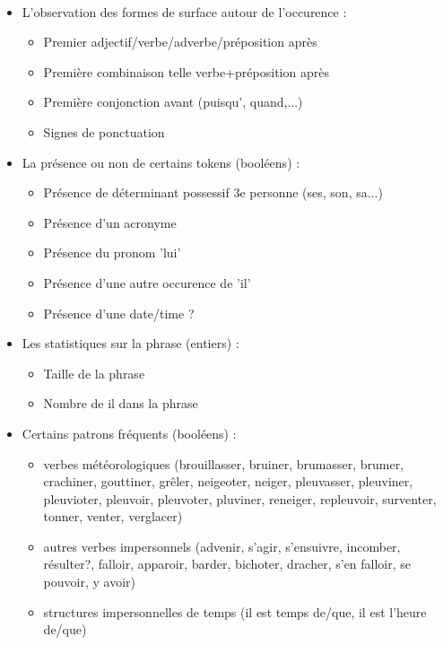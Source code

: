 \documentclass[a4paper,12pt]{article}
\begin{document}
\paragraph{}
\begin{itemize}
 \item[\textbullet] L'observation des formes de surface autour de l'occurence :
 \begin{itemize}
  \item Premier adjectif/verbe/adverbe/préposition après
  \item Première combinaison telle verbe+préposition après
  \item Première conjonction avant (puisqu', quand,...)
  \item Signes de ponctuation
 \end{itemize}
 \item[\textbullet] La présence ou non de certains tokens (booléens) :
 \begin{itemize}
  \item Présence de déterminant possessif 3e personne (ses, son, sa...)
  \item Présence d'un acronyme
  \item Présence du pronom 'lui'
  \item Présence d'une autre occurence de 'il'
  \item Présence d'une date/time ?
 \end{itemize}
 \item[\textbullet] Les statistiques sur la phrase (entiers) :
 \begin{itemize}
  \item Taille de la phrase
  \item Nombre de \og{}il\fg{} dans la phrase
 \end{itemize}
 \item[\textbullet] Certains patrons fréquents (booléens) :
 \begin{itemize}
  \item verbes météorologiques (brouillasser, bruiner, brumasser, brumer, crachiner, gouttiner, grêler, neigeoter, neiger, pleuvasser, pleuviner, pleuvioter, pleuvoir, pleuvoter,  pluviner, reneiger, repleuvoir, surventer, tonner, venter, verglacer)
  \item autres verbes impersonnels (advenir, s'agir, s'ensuivre, incomber, résulter?, falloir, apparoir, barder, bichoter, dracher, s'en falloir, se pouvoir, y avoir)
  \item structures impersonnelles de temps (il est temps de/que, il est l'heure de/que)

\end{itemize}
\end{itemize}
\end{document}
